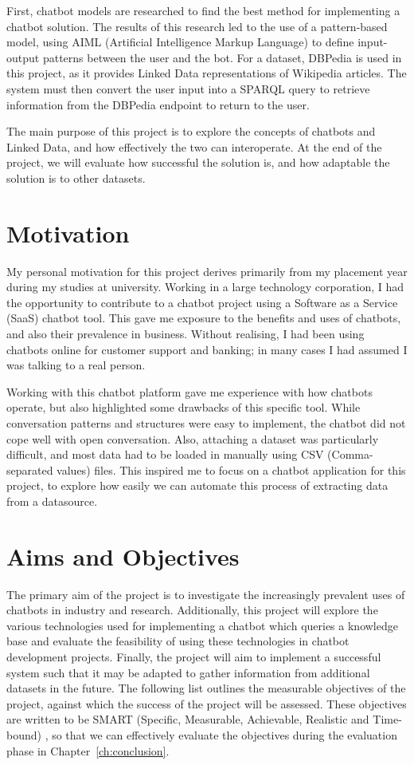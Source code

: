 First, chatbot models are researched to find the best method for implementing a chatbot solution. The results of this research led to the use of a pattern-based model, using AIML (Artificial Intelligence Markup Language) to define input-output patterns between the user and the bot. For a dataset, DBPedia \cite{dbpedia2019about} is used in this project, as it provides Linked Data representations of Wikipedia articles. The system must then convert the user input into a SPARQL query to retrieve information from the DBPedia endpoint to return to the user.

The main purpose of this project is to explore the concepts of chatbots and Linked Data, and how effectively the two can interoperate. At the end of the project, we will evaluate how successful the solution is, and how adaptable the solution is to other datasets.

\section{Motivation}
My personal motivation for this project derives primarily from my placement year during my studies at university. Working in a large technology corporation, I had the opportunity to contribute to a chatbot project using a Software as a Service (SaaS) chatbot tool. This gave me exposure to the benefits and uses of chatbots, and also their prevalence in business. Without realising, I had been using chatbots online for customer support and banking; in many cases I had assumed I was talking to a real person.

Working with this chatbot platform gave me experience with how chatbots operate, but also highlighted some drawbacks of this specific tool. While conversation patterns and structures were easy to implement, the chatbot did not cope well with open conversation. Also, attaching a dataset was particularly difficult, and most data had to be loaded in manually using CSV (Comma-separated values) files. This inspired me to focus on a chatbot application for this project, to explore how easily we can automate this process of extracting data from a datasource.

\newpage
\section{Aims and Objectives}
\label{sec:aims}
The primary aim of the project is to investigate the increasingly prevalent uses of chatbots in industry and research. Additionally, this project will explore the various technologies used for implementing a chatbot which queries a knowledge base and evaluate the feasibility of using these technologies in chatbot development projects. Finally, the project will aim to implement a successful system such that it may be adapted to gather information from additional datasets in the future. The following list outlines the measurable objectives of the project, against which the success of the project will be assessed. These objectives are written to be SMART (Specific, Measurable, Achievable, Realistic and Time-bound) \cite{smart}, so that we can effectively evaluate the objectives during the evaluation phase in Chapter~\ref{ch:conclusion}.


